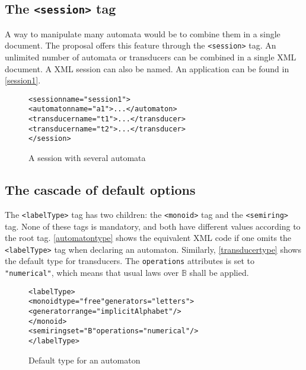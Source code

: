 \documentclass[a4paper]{article}
\newcommand{\xtag}[1]{\texttt{<#1>}}
\newcommand{\xattr}[1]{\texttt{#1}}
\def\typetag{\xtag{labelType}}
\def\sessiontag{\xtag{session}}
\def\monoidtag{\xtag{monoid}}
\def\semiringtag{\xtag{semiring}}
\begin{document}
\subsection{The \sessiontag{} tag}

A way to manipulate many automata would be to combine them in a single
document. The proposal offers this feature through the \sessiontag{}
tag. An unlimited number of automata or transducers can be combined in
a single XML document. A XML session can also be named.  An
application can be found in \autoref{session1}.

\begin{figure}[ht]
  \small
  \begin{center}
\begin{alltt}
<session name="session1">
  <automaton name="a1">...</automaton>
  <transducer name="t1">...</transducer>
  <transducer name="t2">...</transducer>
</session>
\end{alltt}

\caption{A session with several automata}
\label{session1}
  \end{center}
\end{figure}

\subsection{The cascade of default options}

The \typetag{} tag has two children: the \monoidtag{} tag and the
\semiringtag{} tag. None of these tags is mandatory, and both have
different values according to the root tag. \autoref{automatontype}
shows the equivalent XML code if one omits the \typetag{} tag when
declaring an automaton. Similarly, \autoref{transducertype} shows the
default type for transducers.  The \xattr{operations} attributes is
set to \verb|"numerical"|, which means that usual laws over
$\mathbb{B}$ shall be applied.

\begin{figure}[ht]
  \begin{center}
\begin{alltt}
<labelType>
  <monoid type="free" generators="letters">
     <generator range="implicitAlphabet"/>
  </monoid>
  <semiring set="B" operations="numerical"/>
</labelType>
\end{alltt}

\caption{Default type for an automaton}
\label{automatontype}
  \end{center}
\end{figure}
\end{document}
